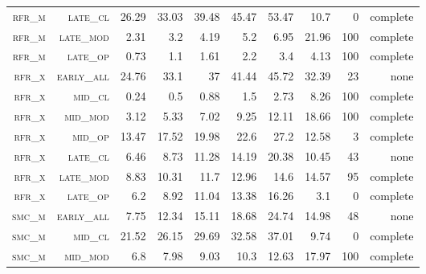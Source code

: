 \begin{landscape}
\begin{table}[!htbp]
\begin{tabular}{@{}rrrrrrr|rrr@{}}
 \textsc{rfr\_m}      &  \textsc{late\_cl  }         &  26.29       &  33.03   &  39.48     &  45.47            &  53.47     &  10.7     &  0     &  complete      \\
 \textsc{rfr\_m}      &  \textsc{late\_mod }        &   2.31        &  3.2     &  4.19      &  5.2              &  6.95      &  21.96    &  100   &  complete      \\
 \textsc{rfr\_m}      &  \textsc{late\_op  }        &   0.73        &  1.1     &  1.61      &  2.2              &  3.4       &  4.13     &  100   &  complete     \\
 \textsc{rfr\_x}      &  \textsc{early\_all}         &  24.76       &  33.1    &  37        &  41.44            &  45.72     &  32.39    &  23    &  none      \\
 \textsc{rfr\_x}      &  \textsc{mid\_cl   }        &   0.24        &  0.5     &  0.88      &  1.5              &  2.73      &  8.26     &  100   &  complete      \\
 \textsc{rfr\_x}      &  \textsc{mid\_mod  }        &   3.12        &  5.33    &  7.02      &  9.25             &  12.11     &  18.66    &  100   &  complete      \\
 \textsc{rfr\_x}      &  \textsc{mid\_op   }        &   13.47       &  17.52   &  19.98     &  22.6             &  27.2      &  12.58    &  3     &  complete      \\
 \textsc{rfr\_x}      &  \textsc{late\_cl  }        &   6.46        &  8.73    &  11.28     &  14.19            &  20.38     &  10.45    &  43    &  none      \\
 \textsc{rfr\_x}      &  \textsc{late\_mod }        &   8.83        &  10.31   &  11.7      &  12.96            &  14.6      &  14.57    &  95    &  complete      \\
 \textsc{rfr\_x}      &  \textsc{late\_op  }        &   6.2         &  8.92    &  11.04     &  13.38            &  16.26     &  3.1      &  0     &  complete     \\
 \textsc{smc\_m}      &  \textsc{early\_all}        &   7.75        &  12.34   &  15.11     &  18.68            &  24.74     &  14.98    &  48    &  none      \\
 \textsc{smc\_m}      &  \textsc{mid\_cl   }        &   21.52       &  26.15   &  29.69     &  32.58            &  37.01     &  9.74     &  0     &  complete     \\
 \textsc{smc\_m}      &  \textsc{mid\_mod  }        &   6.8         &  7.98    &  9.03      &  10.3             &  12.63     &  17.97    &  100   &  complete     \\

\end{tabular}
\end{table}
\end{landscape}
